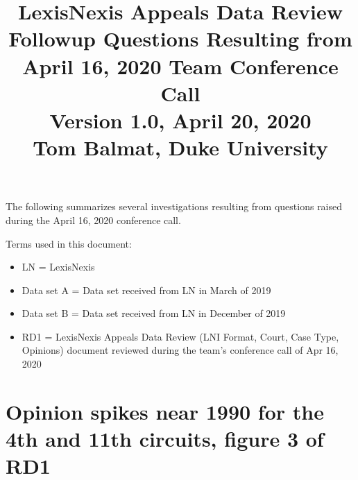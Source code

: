 \documentclass[10pt, letterpaper]{article}
\title{\large LexisNexis Appeals Data Review\\[4pt]Followup Questions Resulting from April 16, 2020 Team Conference Call\\[4pt]\normalsize Version 1.0, April 20, 2020\\[4pt]Tom Balmat, Duke University\\[-20pt]}
\date{}
\begin{document}
    
\begin{spacing}{1.0}

\maketitle

The following summarizes several investigations resulting from questions raised during the April 16, 2020 conference call.

\vspace{0.25in}

Terms used in this document:

\begin{itemize}\setlength\itemsep{1pt}
    \item LN = LexisNexis
    \item Data set A = Data set received from LN in March of 2019
    \item Data set B = Data set received from LN in December of 2019
    \item RD1 = LexisNexis Appeals Data Review (LNI Format, Court, Case Type, Opinions) document reviewed during the team's conference call of Apr 16, 2020
\end{itemize}
    

\renewcommand\cfttoctitlefont{\large}
\renewcommand\cftsecfont{\normalsize}
\renewcommand\cftsecpagefont{\normalsize}
\renewcommand\cftsubsecfont{\normalsize}
\renewcommand\cftsubsecpagefont{\normalsize}
\renewcommand{\cftsecleader}{\cftdotfill{\cftdotsep}}
\renewcommand*\contentsname{List of Sections}
    \begin{minipage}{5.5in}
        \tableofcontents
    \end{minipage}


\clearpage

\section{Opinion spikes near 1990 for the 4th and 11th circuits, figure 3 of RD1}


\end{spacing}
\end{document}
